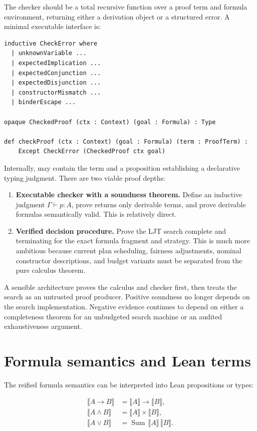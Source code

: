 \documentclass[10pt,letterpaper,oneside]{report}
\newcommand{\code}[1]{\texttt{\detokenize{#1}}}
\newcommand{\term}[1]{\textbf{#1}}
\begin{document}
The checker should be a total recursive function over a proof term and formula environment, returning either a derivation object or a structured error. A minimal executable interface is:

\begin{lstlisting}[language=Leanish]
inductive CheckError where
  | unknownVariable ...
  | expectedImplication ...
  | expectedConjunction ...
  | expectedDisjunction ...
  | constructorMismatch ...
  | binderEscape ...

opaque CheckedProof (ctx : Context) (goal : Formula) : Type

def checkProof (ctx : Context) (goal : Formula) (term : ProofTerm) :
    Except CheckError (CheckedProof ctx goal)
\end{lstlisting}

Internally, \code{CheckedProof} may contain the term and a proposition establishing a declarative typing judgment. There are two viable proof depths:

\begin{enumerate}
  \item \term{Executable checker with a soundness theorem.} Define an inductive judgment \(\Gamma \vdash p : A\), prove \code{checkProof} returns only derivable terms, and prove derivable formulas semantically valid. This is relatively direct.
  \item \term{Verified decision procedure.} Prove the LJT search complete and terminating for the exact formula fragment and strategy. This is much more ambitious because current plan scheduling, fairness adjustments, nominal constructor descriptions, and budget variants must be separated from the pure calculus theorem.
\end{enumerate}

A sensible architecture proves the calculus and checker first, then treats the search as an untrusted proof producer. Positive soundness no longer depends on the search implementation. Negative evidence continues to depend on either a completeness theorem for an unbudgeted search machine or an audited exhaustiveness argument.

\section{Formula semantics and Lean terms}

The reified formula semantics can be interpreted into Lean propositions or types:

\begin{align*}
\llbracket A \to B \rrbracket &= \llbracket A \rrbracket \to \llbracket B \rrbracket,\\
\llbracket A \land B \rrbracket &= \llbracket A \rrbracket \times \llbracket B \rrbracket,\\
\llbracket A \lor B \rrbracket &= \operatorname{Sum}\,\llbracket A \rrbracket\,\llbracket B \rrbracket.
\end{align*}
\end{document}

